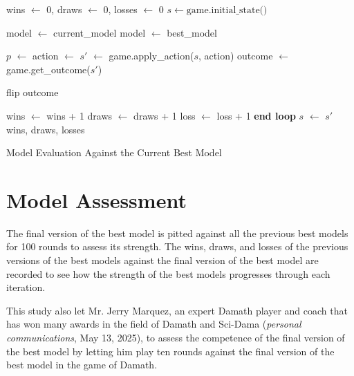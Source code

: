 \begin{algorithm}[H]
    \begin{algorithmic}[1]
          \State wins $\gets$ 0, draws $\gets$ 0, losses $\gets$ 0
          \Repeat
            \State $s \gets \text{game.initial\_state()}$ 
            \Loop

                  \State model $\gets$ current\_model
                \Else
                  \State model $\gets$ best\_model
                \EndIf

                \State $p$ $\gets$ 
                \State action $\gets$ 
                \State $s'$ $\gets$ game.apply\_action($s$, action)
                    \State outcome $\gets$ game.get\_outcome($s'$)

                      \State flip outcome
                    \EndIf

                      \State wins $\gets$ wins + 1
                      \State draws $\gets$ draws + 1
                      \State loss $\gets$ loss + 1
                    \EndIf
                    \State \textbf{end loop}
                \EndIf
                \State $s$ $\gets$ $s'$
            \EndLoop
          \State \Return wins, draws, losses
        \EndFunction
    \end{algorithmic}
    \caption{Model Evaluation Against the Current Best Model}
    \label{alg:evaluate}
\end{algorithm}

\section{Model Assessment}

The final version of the best model is pitted against all the previous best models for 100 rounds to assess its strength. The wins, draws, and losses of the previous versions of the best models against the final version of the best model are recorded to see how the strength of the best models progresses through each iteration.

This study also let Mr. Jerry Marquez, an expert Damath player and coach that has won many awards in the field of Damath and Sci-Dama (\textit{personal communications}, May 13, 2025), to %
assess the competence %
of the final version of the best model by letting him play ten rounds against the final version of the best model in the game of Damath. %

